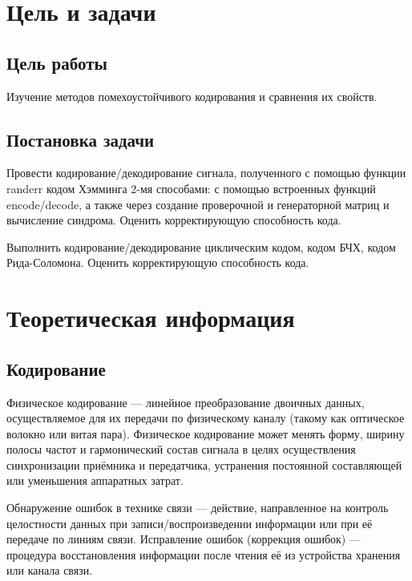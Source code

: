 

\setcounter{tocdepth}{3}






\section{Цель и задачи}

\subsection{Цель работы}
Изучение методов помехоустойчивого кодирования и сравнения их свойств.
 
\subsection{Постановка задачи}
Провести кодирование/декодирование сигнала, полученного с помощью функции randerr кодом Хэмминга 2-мя способами: с помощью встроенных функций encode/decode, а также через создание проверочной и генераторной матриц и вычисление синдрома. Оценить корректирующую способность кода.

Выполнить кодирование/декодирование циклическим кодом, кодом БЧХ, кодом Рида-Соломона. Оценить корректирующую способность кода.

 
\section{Теоретическая информация}

\subsection{Кодирование}
Физическое кодирование — линейное преобразование двоичных данных, осуществляемое для их передачи по физическому каналу (такому как оптическое волокно или витая пара). Физическое кодирование может менять форму, ширину полосы частот и гармонический состав сигнала в целях осуществления синхронизации приёмника и передатчика, устранения постоянной составляющей или уменьшения аппаратных затрат.

Обнаружение ошибок в технике связи — действие, направленное на контроль целостности данных при записи/воспроизведении информации или при её передаче по линиям связи. Исправление ошибок (коррекция ошибок) — процедура восстановления информации после чтения её из устройства хранения или канала связи.

